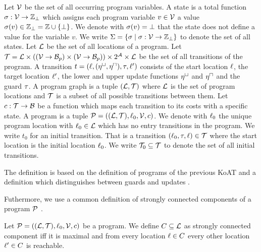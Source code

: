 \begin{definition}[Program] 
  Let $\mathcal{V}$ be the set of all occurring program variables.
  A state is a total function $\sigma: \mathcal{V} \rightarrow \mathbb{Z}_\bot$ which assigns each program variable $v \in \mathcal{V}$ a value $\sigma(v) \in \mathbb{Z}_\bot = \mathbb{Z} \cup \lbrace \bot \rbrace$.
  We denote with $\sigma(v) = \bot$ that the state does not define a value for the variable $v$.
  We write $\Sigma = \lbrace  \sigma \mid \sigma: \mathcal{V} \rightarrow \mathbb{Z}_\bot \rbrace$ to denote the set of all states.
  Let $\mathcal{L}$ be the set of all locations of a program.
  Let $\mathcal{T} = \mathcal{L} \times ((\mathcal{V} \rightarrow \mathcal{B}_p) \times (\mathcal{V} \rightarrow \mathcal{B}_p)) \times 2^{\mathcal{A}} \times \mathcal{L}$ be the set of all transitions of the program.
  A transition $t = (\ell, (\eta^\sqcup, \eta^\sqcap), \tau, \ell')$ consists of the start location $\ell$, the target location $\ell'$, the lower and upper update functions $\eta^\sqcup$ and $\eta^\sqcap$ and the guard $\tau$. 
  A program graph is a tuple $(\mathcal{L}, \mathcal{T})$ where $\mathcal{L}$ is the set of program locations and $\mathcal{T}$ is a subset of all possible transitions between them.
  Let $c: \mathcal{T} \rightarrow \mathcal{B}$ be a function which maps each transition to its costs with a specific state.
  A program is a tuple $\mathcal{P} = ((\mathcal{L}, \mathcal{T}), \ell_0, \mathcal{V}, c)$.
  We denote with $\ell_0$ the unique program location with $\ell_0 \in \mathcal{L}$ which has no entry transitions in the program.
  We write $t_0$ for an initial transition. That is a transition $(\ell_0, \tau, \ell) \in \mathcal{T}$ where the start location is the initial location $\ell_0$.
  We write $\mathcal{T}_0 \subseteq \mathcal{T}$ to denote the set of all initial transitions.
\end{definition}
The definition is based on the definition of programs of the previous KoAT \cite{koat} and a definition which distinguishes between guards and updates \cite{lowerruntime}.

Futhermore, we use a common definition of strongly connected components of a program $\mathcal{P}$ \cite{sccs}.

\begin{definition}
  Let $\mathcal{P} = ((\mathcal{L}, \mathcal{T}), \ell_0, \mathcal{V}, c)$ be a program.
  We define $C \subseteq \mathcal{L}$ as strongly connected component iff it is maximal and from every location $\ell \in C$ every other location $\ell' \in C$ is reachable.
\end{definition}


